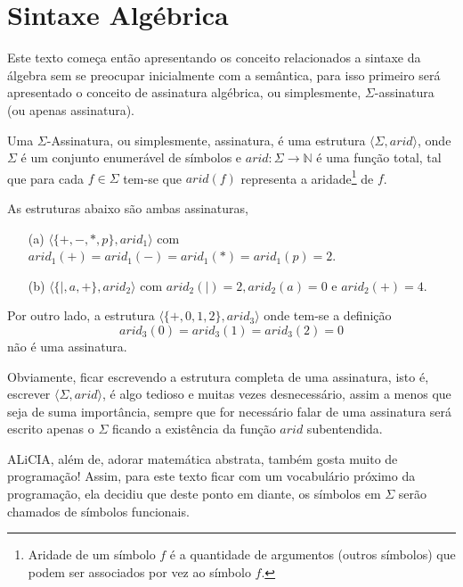 \section{Sintaxe Algébrica}\label{sec:AlgebraSintaxe}

Este texto começa então apresentando os conceito relacionados a sintaxe da álgebra sem se preocupar inicialmente com a semântica, para isso primeiro será apresentado o conceito de assinatura algébrica, ou simplesmente, $\Sigma$-assinatura (ou apenas assinatura).

\begin{definicao}[Assinatura]\label{def:SigmaAssinatura}
  Uma $\Sigma$-Assinatura, ou simplesmente, assinatura, é uma estrutura $\langle \Sigma, arid \rangle$, onde $\Sigma$ é um conjunto enumerável de símbolos e $arid : \Sigma \rightarrow \mathbb{N}$ é uma função total, tal que para cada $f \in \Sigma$ tem-se que $arid(f)$ representa a aridade\footnote{Aridade de um símbolo $f$ é a quantidade de argumentos (outros símbolos) que podem ser associados por vez ao símbolo $f$.} de $f$.
\end{definicao}

\begin{exemplo}\label{exe:SigmaAssinatura1}
  As estruturas abaixo são ambas assinaturas,
  \begin{itemize}
    \item[(a)] $\langle \{+, -, *, p \}, arid_1 \rangle$ com $arid_1(+) = arid_1(-) = arid_1(*) = arid_1(p) = 2$.
    \item[(b)] $\langle \{|, a, +\}, arid_2 \rangle$ com $arid_2(|) = 2,  arid_2(a) = 0$ e $arid_2(+) = 4$.
  \end{itemize}
  Por outro lado, a estrutura $\langle \{+, 0, 1, 2\}, arid_3 \rangle$ onde tem-se a definição 
  $$arid_3(0) = arid_3(1) = arid_3(2) = 0$$ 
  não é uma assinatura.
\end{exemplo}

Obviamente, ficar escrevendo a estrutura completa de uma assinatura, isto é, escrever $\langle \Sigma, arid \rangle$, é algo tedioso e muitas vezes desnecessário, assim a menos que seja de suma importância, sempre que for necessário falar de uma assinatura será escrito apenas o $\Sigma$ ficando a existência da função $arid$ subentendida.

\begin{nota}[Nomenclatura.]
  ALiCIA, além de, adorar matemática abstrata, também gosta muito de programação! Assim, para este texto ficar com um vocabulário próximo da programação, ela decidiu que deste ponto em diante, os símbolos em $\Sigma$ serão chamados de símbolos funcionais.
\end{nota}

